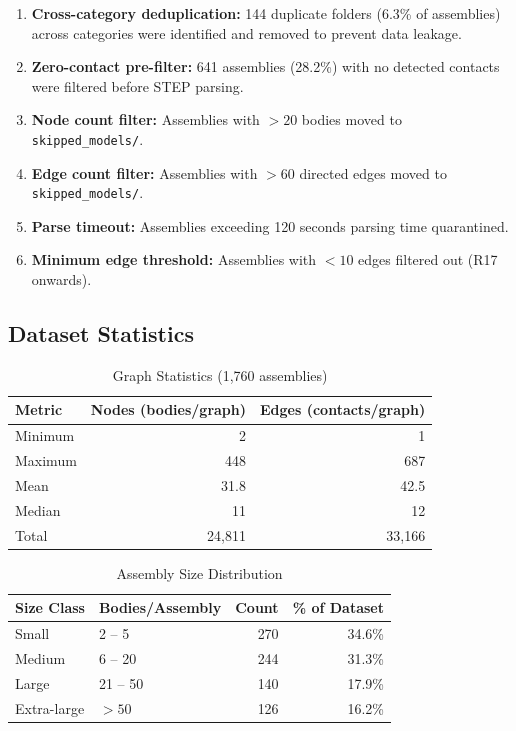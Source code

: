 \documentclass[12pt]{report}
\begin{document}
\begin{enumerate}
    \item \textbf{Cross-category deduplication:} 144 duplicate folders (6.3\% of assemblies) across categories were identified and removed to prevent data leakage.
    \item \textbf{Zero-contact pre-filter:} 641 assemblies (28.2\%) with no detected contacts were filtered before STEP parsing.
    \item \textbf{Node count filter:} Assemblies with $> 20$ bodies moved to \texttt{skipped\_models/}.
    \item \textbf{Edge count filter:} Assemblies with $> 60$ directed edges moved to \texttt{skipped\_models/}.
    \item \textbf{Parse timeout:} Assemblies exceeding 120 seconds parsing time quarantined.
    \item \textbf{Minimum edge threshold:} Assemblies with $< 10$ edges filtered out (R17 onwards).
\end{enumerate}

\subsection{Dataset Statistics}

\begin{table}[H]
\centering
\caption{Graph Statistics (1,760 assemblies)}
\begin{tabular}{l r r}
\toprule
\textbf{Metric} & \textbf{Nodes (bodies/graph)} & \textbf{Edges (contacts/graph)} \\
\midrule
Minimum & 2 & 1 \\
Maximum & 448 & 687 \\
Mean & 31.8 & 42.5 \\
Median & 11 & 12 \\
Total & 24,811 & 33,166 \\
\bottomrule
\end{tabular}
\end{table}

\begin{table}[H]
\centering
\caption{Assembly Size Distribution}
\begin{tabular}{l l r r}
\toprule
\textbf{Size Class} & \textbf{Bodies/Assembly} & \textbf{Count} & \textbf{\% of Dataset} \\
\midrule
Small & 2 -- 5 & 270 & 34.6\% \\
Medium & 6 -- 20 & 244 & 31.3\% \\
Large & 21 -- 50 & 140 & 17.9\% \\
Extra-large & $> 50$ & 126 & 16.2\% \\
\bottomrule
\end{tabular}
\end{table}
\end{document}
